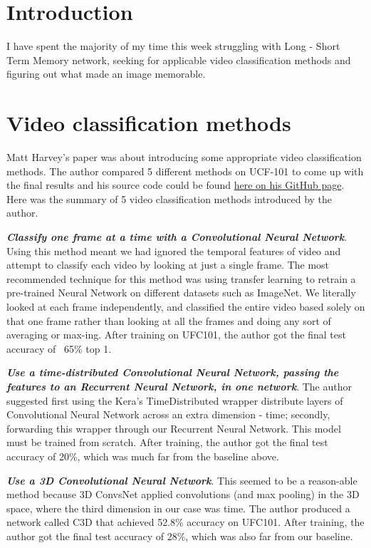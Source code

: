 \section{Introduction}
I have spent the majority of my time this week struggling with Long - Short Term Memory network, seeking for applicable video classification methods and figuring out what made an image memorable.

\section{Video classification methods}
Matt Harvey's paper\cite{5videomethods} was about introducing some appropriate video classification methods. The author compared 5 different methods on UCF-101\cite{ucf101} to come up with the final results and his source code could be found \href{https://github.com/harvitronix/five-video-classification-methods}{here on his GitHub page}. Here was the summary of 5 video classification methods introduced by the author.

\textbf{\emph{Classify one frame at a time with a Convolutional Neural Network}}. Using this method meant we had ignored the temporal features of video and attempt to classify each video by looking at just a single frame. The most recommended technique for this method was using transfer learning to retrain a pre-trained Neural Network on different datasets such as ImageNet. We literally looked at each frame independently, and classified the entire video based solely on that one frame rather than looking at all the frames and doing any sort of averaging or max-ing. After training on UFC101, the author got the final test accuracy of ~65\% top 1.

\textbf{\emph{Use a time-distributed Convolutional Neural Network, passing the features to an Recurrent Neural Network, in one network}}. The author suggested first using the Kera's TimeDistributed wrapper distribute layers of Convolutional Neural Network across an extra dimension - time; secondly, forwarding this wrapper through our Recurrent Neural Network. This model must be trained from scratch. After training, the author got the final test accuracy of 20\%, which was much far from the baseline above. 

\textbf{\emph{Use a 3D Convolutional Neural Network}}. This seemed to be a reason-able method because 3D ConvsNet applied convolutions (and max pooling) in the 3D space, where the third dimension in our case was time. The author produced a network called C3D that achieved 52.8\% accuracy on UFC101. After training, the author got the final test accuracy of 28\%, which was also far from our baseline.

